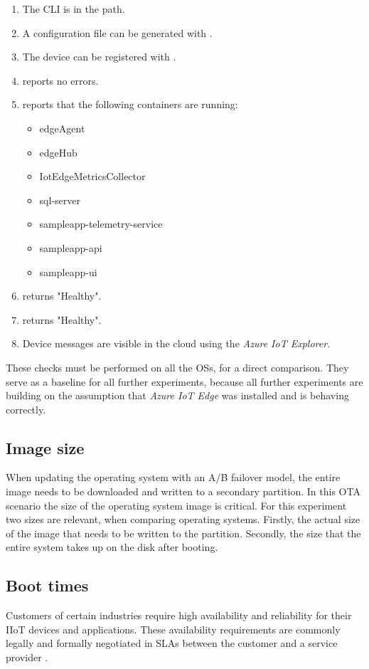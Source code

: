 \begin{enumerate}
    \item The  \ac{CLI} is in the path.
    \item A configuration file can be generated with .
    \item The device can be registered with .
    \item {} reports no errors.
    \item {} reports that the following containers
    are running:
    \begin{itemize}
        \item edgeAgent
        \item edgeHub
        \item IotEdgeMetricsCollector
        \item sql-server
        \item sampleapp-telemetry-service
        \item sampleapp-api
        \item sampleapp-ui
    \end{itemize}
    \item {} returns "Healthy".
    \item {} returns "Healthy".
    \item Device messages are visible in the cloud using the \textit{Azure IoT Explorer}.
\end{enumerate}
These checks must be performed on all the \ac{OS}s, for a direct comparison.
They serve as a baseline for all further experiments, because all further
experiments are building on the assumption that \textit{Azure IoT Edge} was
installed and is behaving correctly.

\subsection{Image size}
When updating the operating system with an A/B failover model, the entire
image needs to be downloaded and written to a secondary partition. In this
\ac{OTA} scenario the size of the operating system image is critical.
For this experiment two sizes are relevant, when comparing operating systems.
Firstly, the actual size of the image that needs to be written to the partition.
Secondly, the size that the entire system takes up on the disk after booting.

\subsection{Boot times}
Customers of certain industries require high availability and reliability for
their \ac{IIoT} devices and applications. These availability requirements
are commonly legally and formally negotiated in \ac{SLA}s between
the customer and a service provider \cite{msdoc-slas}.

